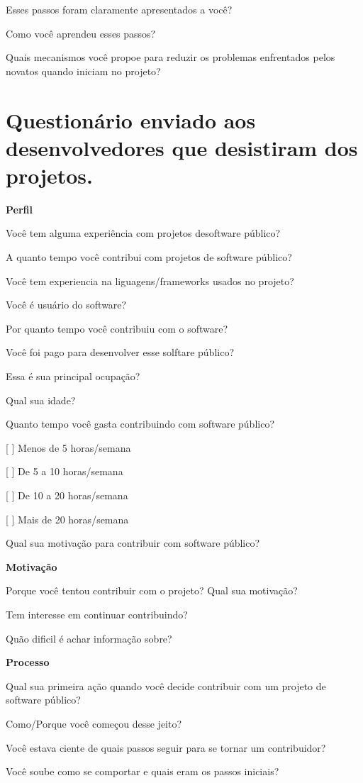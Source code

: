 \begin{anexosenv}
Esses passos foram claramente apresentados a você?

Como você aprendeu esses passos?

Quais mecanismos você propoe para reduzir os problemas enfrentados pelos novatos quando iniciam no projeto?


\chapter{Questionário enviado aos desenvolvedores que desistiram dos projetos.}
\label{anexo c}

\textbf{Perfil}

Você tem alguma experiência com projetos desoftware público?

A quanto tempo você contribui com projetos de software público?

Você tem experiencia na liguagens/frameworks usados no projeto?

Você é usuário do software?

Por quanto tempo você contribuiu com o software?

Você foi pago para desenvolver esse solftare público?

Essa é sua principal ocupação?

Qual sua idade?

Quanto tempo você gasta contribuindo com software público?

[ ] Menos de 5 horas/semana 

[ ] De 5 a 10 horas/semana

[ ] De 10 a 20 horas/semana

[ ] Mais de 20 horas/semana

Qual sua motivação para contribuir com software público?


\textbf{Motivação}

Porque você tentou contribuir com o projeto? Qual sua motivação?

Tem interesse em continuar contribuindo?

Quão dificil é achar informação sobre?


\textbf{Processo}

Qual sua primeira ação quando você decide contribuir com um projeto de software público?

Como/Porque você começou desse jeito?

Você estava ciente de quais passos seguir para se tornar um contribuidor?

Você soube como se comportar e quais eram os passos iniciais?


\end{anexosenv}
